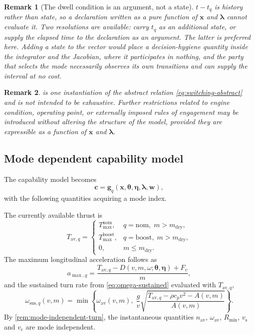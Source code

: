 \documentclass[11pt,a4paper]{article}
\newtheorem{remark}{Remark}
\newcommand{\vecx}{\bm{x}}
\newcommand{\vecw}{\bm{w}}
\newcommand{\vecc}{\bm{c}}
\newcommand{\vectheta}{\bm{\theta}}
\newcommand{\veceta}{\bm{\eta}}
\newcommand{\veclambda}{\bm{\lambda}}
\newcommand{\vecg}{\bm{g}}
\begin{document}
\begin{remark}[The dwell condition is an argument, not a state]
$t - t_{q}$ is history rather than state, so a declaration written as a pure
function of $\vecx$ and $\veclambda$ cannot evaluate it. Two resolutions are
available: carry $t_{q}$ as an additional state, or supply the elapsed time to
the declaration as an argument. The latter is preferred here. Adding a state to
the vector would place a decision-hygiene quantity inside the integrator and
the Jacobian, where it participates in nothing, and the party that selects the
mode necessarily observes its own transitions and can supply the interval at no
cost.
\end{remark}

\begin{remark}
 is one instantiation of the abstract relation
\cref{eq:switching-abstract} and is not intended to be exhaustive. Further
restrictions related to engine condition, operating point, or externally imposed
rules of engagement may be introduced without altering the structure of the
model, provided they are expressible as a function of $\vecx$ and $\veclambda$.
\end{remark}

\subsection{Mode dependent capability model}

The capability model becomes
\begin{equation}
  \vecc = \vecg_q(\vecx, \vectheta, \veceta, \veclambda, \vecw),
\end{equation}
with the following quantities acquiring a mode index.

The currently available thrust is
\begin{equation}
  T_{\mathrm{av},q} =
  \begin{cases}
    T^{\mathrm{nom}}_{\max}, & q = \mathrm{nom},\; m > m_{\mathrm{dry}}, \\
    T^{\mathrm{boost}}_{\max}, & q = \mathrm{boost},\; m > m_{\mathrm{dry}}, \\
    0, & m \le m_{\mathrm{dry}} .
  \end{cases}
\end{equation}
The maximum longitudinal acceleration follows as
\begin{equation}
  a_{\max,q} = \frac{T_{\mathrm{av},q} - D(v, m, \omega; \vectheta, \veceta) + F_v}{m},
\end{equation}
and the sustained turn rate from \cref{eq:omega-sustained} evaluated with
$T_{\mathrm{av},q}$,
\begin{equation}
  \omega_{\mathrm{sus},q}(v, m) =
  \min\left\{
    \omega_{\mathrm{av}}(v,m),\;
    \frac{g}{v}
    \sqrt{\frac{T_{\mathrm{av},q} - \rho c_p v^{2} - A(v,m)}{A(v,m)}}
  \right\}.
\end{equation}
By \cref{rem:mode-independent-turn}, the instantaneous quantities
$n_{\mathrm{av}}$, $\omega_{\mathrm{av}}$, $R_{\min}$, $v_{\mathrm{s}}$ and
$v_{\mathrm{c}}$ are mode independent.
\end{document}

